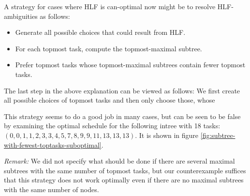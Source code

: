 A strategy for cases where HLF is can-optimal now might be to resolve HLF-ambiguities as follows:
\begin{itemize}
\item Generate all possible choices that could result from HLF.
\item For each topmost task, compute the topmost-maximal subtree.
\item Prefer topmost tasks whose topmost-maximal subtrees contain fewer topmost tasks.
\end{itemize}

The last step in the above explanation can be viewed as follows: We first create all possible choices of topmost tasks and then only choose those, whose

This strategy seems to do a good job in many cases, but can be seen to be false by examining the optimal schedule for the following intree with 18 tasks: $(0,0,1,1,2,3,3,4,5,7,8,9,9,11,13,13,13)$. It is shown in figure \ref{fig:subtree-with-fewest-toptasks-suboptimal}.

\emph{Remark:} We did not specify what should be done if there are several maximal subtrees with the same number of topmost tasks, but our counterexample suffices that this strategy does not work optimally even if there are no maximal subtrees with the same number of nodes.

